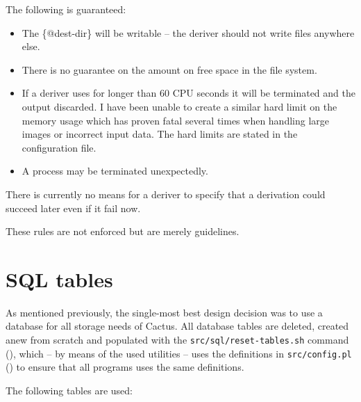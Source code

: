 The following is guaranteed:

\begin{itemize}

\item The \{@dest-dir\} will be writable -- the deriver should not
write files anywhere else.

\item There is no guarantee on the amount on free space in the file
system.

\item If a deriver uses for longer than 60 CPU seconds it will be
terminated and the output discarded.  I have been unable to create a
similar hard limit on the memory usage which has proven fatal several
times when handling large images or incorrect input data.  The hard
limits are stated in the configuration file.

\item A process may be terminated unexpectedly.
\end{itemize}

There is currently no means for a deriver to specify that a derivation
could succeed later even if it fail now.

These rules are not enforced but are merely guidelines.

\section{SQL tables}

As mentioned previously, the single-most best design decision was to
use a database for all storage needs of Cactus.  All database tables
are deleted, created anew from scratch and populated with the
\texttt{src/sql/reset-tables.sh} command
(), which -- by means of the used
utilities -- uses the definitions in \texttt{src/config.pl}
() to ensure that all programs uses the same
definitions.

The following tables are used:



